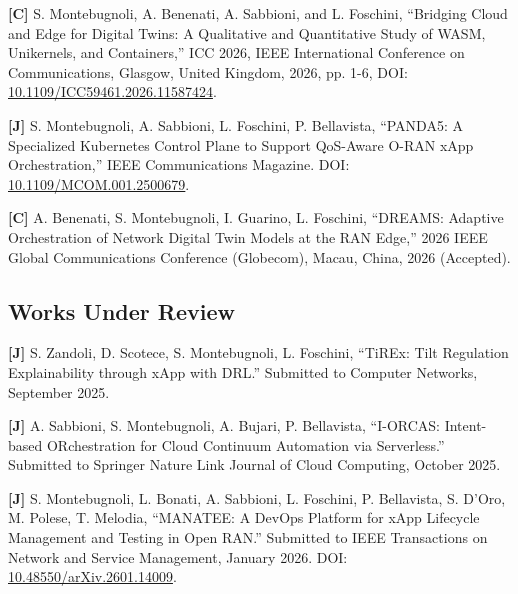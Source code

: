 \documentclass[a4paper,11pt]{article}
\begin{document}
{\begin{enumerate}[label={[\arabic*]}]
    \item \textbf{[C]} S. Montebugnoli, A. Benenati, A. Sabbioni, and L. Foschini, ``Bridging Cloud and Edge for Digital Twins: A Qualitative and Quantitative Study of WASM, Unikernels, and Containers,'' ICC 2026, IEEE International Conference on Communications, Glasgow, United Kingdom, 2026, pp. 1-6, DOI: \href{https://doi.org/10.1109/ICC59461.2026.11587424}{10.1109/ICC59461.2026.11587424}.

    \item \textbf{[J]} S. Montebugnoli, A. Sabbioni, L. Foschini, P. Bellavista, ``PANDA5: A Specialized Kubernetes Control Plane to Support QoS-Aware O-RAN xApp Orchestration,'' IEEE Communications Magazine. DOI: \href{https://doi.org/10.1109/MCOM.001.2500679}{10.1109/MCOM.001.2500679}.

    \item \textbf{[C]} A. Benenati, S. Montebugnoli, I. Guarino, L. Foschini, ``DREAMS: Adaptive Orchestration of Network Digital Twin Models at the RAN Edge,'' 2026 IEEE Global Communications Conference (Globecom), Macau, China, 2026 (Accepted).

\end{enumerate}

\subsection*{Works Under Review}

\begin{enumerate}[label={[\arabic*]}, start=17]

    \item \textbf{[J]} S. Zandoli, D. Scotece, S. Montebugnoli, L. Foschini, ``TiREx: Tilt Regulation Explainability through xApp with DRL.'' Submitted to Computer Networks, September 2025.

    \item \textbf{[J]} A. Sabbioni, S. Montebugnoli, A. Bujari, P. Bellavista, ``I-ORCAS: Intent-based ORchestration for Cloud Continuum Automation via Serverless.'' Submitted to Springer Nature Link Journal of Cloud Computing, October 2025.

    \item \textbf{[J]} S. Montebugnoli, L. Bonati, A. Sabbioni, L. Foschini, P. Bellavista, S. D'Oro, M. Polese, T. Melodia, ``MANATEE: A DevOps Platform for xApp Lifecycle Management and Testing in Open RAN.'' Submitted to IEEE Transactions on Network and Service Management, January 2026. DOI: \href{https://doi.org/10.48550/arXiv.2601.14009}{10.48550/arXiv.2601.14009}.



\end{enumerate}}
\end{document}
